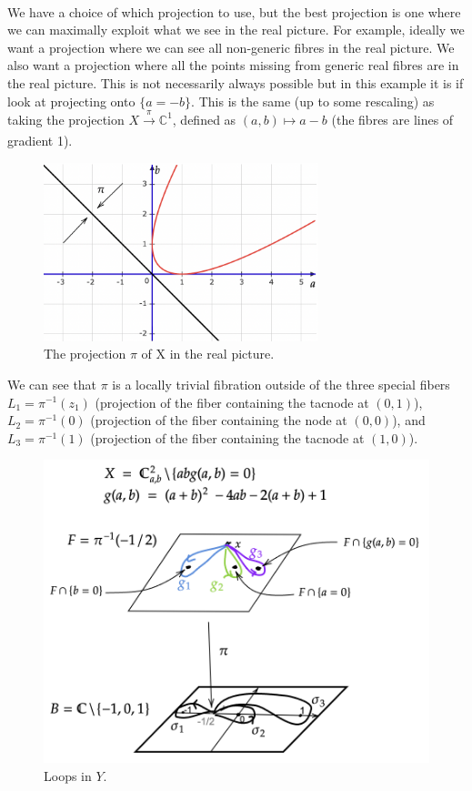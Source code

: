 \documentclass[oneside]{amsart}
\theoremstyle{definition}
\theoremstyle{definition}
\theoremstyle{definition}
\theoremstyle{definition}
\newcommand{\CC}{\mathbb{C}}
\begin{document}
\\
\newline
We have a choice of which projection to use, but the best projection is one where we can maximally exploit what we see in the real picture. For example, ideally we want a projection where we can see all non-generic fibres in the real picture. We also want a projection where all the points missing from generic real fibres are in the real picture. This is not necessarily always possible but in this example it is if look at projecting onto $\{ a=-b \}$. This is the same (up to some rescaling) as taking the projection $X \xrightarrow[]{\pi} \CC^1$, defined as $(a,b) \mapsto a-b$ (the fibres are lines of gradient 1).
\begin{figure}[!h]
    \centering
    \includegraphics[width=8cm]{rank2exmp/projection1.png}
    \caption{The projection $\pi$ of X in the real picture.}
    \label{projection1}
\end{figure}
We can see that $\pi$ is a locally trivial fibration outside of the three special fibers $L_1 = \pi^{-1}(z_1)$ (projection of the fiber containing the tacnode at $(0, 1)$), $L_2 = \pi^{-1}(0)$ (projection of the fiber containing the node at $(0, 0)$), and $L_3= \pi^{-1}(1)$ (projection of the fiber containing the tacnode at $(1, 0)$). 
\begin{figure}[!h]
    \centering
    \includegraphics[width=12cm]{rank2exmp/zariski1.png}
    \caption{Loops in $Y$.}
    \label{zariski1}
\end{figure}
\end{document}
